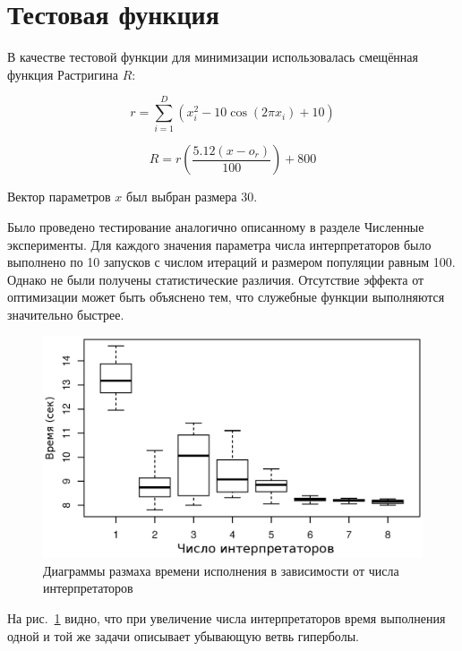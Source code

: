 \section*{Тестовая функция}

В качестве тестовой функции для минимизации
использовалась смещённая функция Растригина $R$:

\begin{equation*}
    r = \sum_{i = 1}^{D}(x_i^2 - 10\cos(2 \pi x_i) + 10)
\end{equation*}

\begin{equation*}
    R = r\left(\frac{5.12 (x - o_r)}{100}\right) + 800
\end{equation*}

Вектор параметров $x$ был выбран размера 30.

Было проведено тестирование
аналогично описанному в разделе
Численные эксперименты.
Для каждого значения параметра
числа интерпретаторов было выполнено
по 10 запусков
с числом итераций и размером популяции
равным 100.
Однако не были получены
статистические различия.
Отсутствие эффекта
от оптимизации может
быть объяснено тем,
что служебные функции
выполняются значительно быстрее.

\begin{figure}[h]
\includegraphics{rastrigin}
\caption{Диаграммы размаха времени исполнения
в зависимости от числа интерпретаторов}
\label{fig:rastriginboxplot}
\end{figure}

На рис.~\ref{fig:rastriginboxplot} видно,
что при увеличение числа интерпретаторов
время выполнения одной и той же задачи
описывает убывающую ветвь гиперболы.

